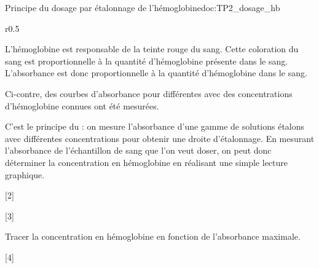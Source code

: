 \begin{doc}{Principe du dosage par étalonnage de l'hémoglobine}{doc:TP2_dosage_hb}
  \begin{wrapfigure}[10]{r}{0.5\linewidth}
    \centering
    \vspace*{-18pt}
  \end{wrapfigure}
  
  L'hémoglobine est responsable de la teinte rouge du sang.
  Cette coloration du sang est proportionnelle à la quantité d'hémoglobine présente dans le sang.
  L'absorbance est donc proportionnelle à la quantité d'hémoglobine dans le sang.
  
  Ci-contre, des courbes d'absorbance pour différentes  avec des concentrations d'hémoglobine connues ont été mesurées.
  
  C'est le principe du  : on mesure l'absorbance d'une gamme de solutions étalons avec différentes concentrations pour obtenir une droite d'étalonnage.
  En  mesurant l'absorbance de l'échantillon de sang que l'on veut doser, on peut donc déterminer la concentration en hémoglobine en réalisant une simple lecture graphique.
\end{doc}

[2]

[3]


\mesure Tracer la concentration en hémoglobine en fonction de l'absorbance maximale.

[4]


